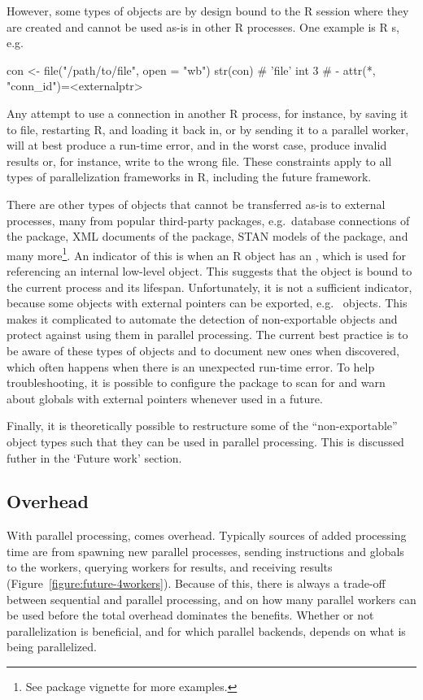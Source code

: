 However, some types of objects are by design bound to the R session
where they are created and cannot be used as-is in other R processes.
One example is R s, e.g.
\begin{example}
con <- file("/path/to/file", open = "wb")
str(con)
#  'file' int 3
#  - attr(*, "conn_id")=<externalptr> 
\end{example}
Any attempt to use a connection in another R process, for instance, by
saving it to file, restarting R, and loading it back in, or by sending
it to a parallel worker, will at best produce a run-time error, and in
the worst case, produce invalid results or, for instance, write to the
wrong file.  These constraints apply to all types of parallelization
frameworks in R, including the future framework.

There are other types of objects that cannot be transferred as-is to
external processes, many from popular third-party packages, e.g.\
database connections of the  package, XML documents of
the \CRANpkg{xml2} package, STAN models of the \CRANpkg{stan} package,
and many more\footnote{See \pkg{future} package vignette
 for more examples.}.
An indicator of this is when an R object has an , which is used for referencing an internal low-level
object. This suggests that the object is bound to the current process
and its lifespan.  Unfortunately, it is not a sufficient indicator,
because some objects with external pointers can be exported,
e.g.\  objects.  This makes it complicated to
automate the detection of non-exportable objects and protect against
using them in parallel processing.  The current best practice is to be
aware of these types of objects and to document new ones when
discovered, which often happens when there is an unexpected run-time
error.  To help troubleshooting, it is possible to configure
the  package to scan for and warn about globals with
external pointers whenever used in a future.

Finally, it is theoretically possible to restructure some of the
``non-exportable'' object types such that they can be used in parallel
processing.  This is discussed futher in the `Future work' section.


\subsection{Overhead}
\label{overhead}

With parallel processing, comes overhead.  Typically sources of added
processing time are from spawning new parallel processes,
sending instructions and globals to the workers, querying workers for
results, and receiving results (Figure~\ref{figure:future-4workers}).
Because of this, there is always a trade-off between sequential and
parallel processing, and on how many parallel workers can be used
before the total overhead dominates the benefits.  Whether or not
parallelization is beneficial, and for which parallel backends,
depends on what is being parallelized.

